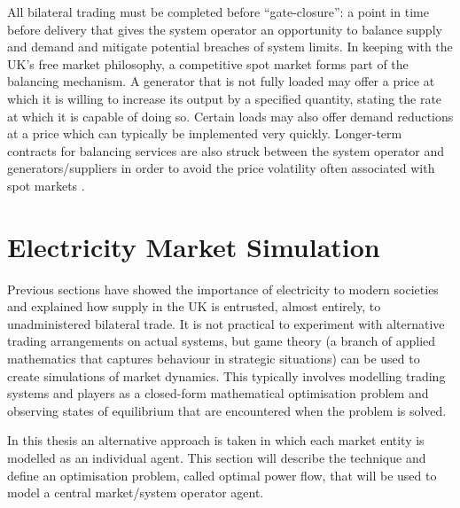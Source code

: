 All bilateral trading must be completed before ``gate-closure'': a point in time
before delivery that gives the system operator an opportunity to balance supply
and demand and mitigate potential breaches of system limits.  In keeping with
the UK's free market philosophy, a competitive spot market \cite{schweppe:spot}
forms part of the balancing mechanism.  A generator that is not fully loaded
may offer a price at which it is willing to increase its output by a specified
quantity, stating the rate at which it is capable of doing so.  Certain loads
may also offer demand reductions at a price which can typically be implemented
very quickly.  Longer-term contracts for balancing services are also struck
between the system operator and generators/suppliers in order to avoid the price
volatility often associated with spot markets \cite{kirschen:book}.


\section{Electricity Market Simulation}

Previous sections have showed the importance of electricity to modern societies
and explained how supply in the UK is entrusted, almost entirely, to
unadministered bilateral trade. It is not practical to experiment with
alternative trading arrangements on actual systems, but game theory (a branch of
applied mathematics that captures behaviour in strategic situations) can be used
to create simulations of market dynamics.  This typically involves modelling
trading systems and players as a closed-form mathematical optimisation problem
and observing states of equilibrium that are encountered when the problem is
solved.

In this thesis an alternative approach is taken in which each market entity is
modelled as an individual agent.  This section will describe the technique and
define an optimisation problem, called optimal power flow, that will be used to
model a central market/system operator agent.



